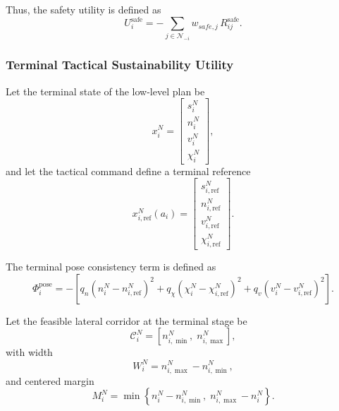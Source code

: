 \documentclass[final ,3p, times]{elsarticle}
\begin{document}
Thus, the safety utility is defined as
\begin{equation}
U_i^{\mathrm{safe}}
=
-
\sum_{j\in\mathcal{N}_{-i}}
w_{safe,j}\,
R_{ij}^{\mathrm{safe}}.
\label{eq:safety_utility}
\end{equation}

\subsubsection{Terminal Tactical Sustainability Utility}

Let the terminal state of the low-level plan be
\begin{equation}
x_i^{N}=
\begin{bmatrix}
s_i^{N}\\
n_i^{N}\\
v_i^{N}\\
\chi_i^{N}
\end{bmatrix},
\label{eq:terminal_state}
\end{equation}
and let the tactical command define a terminal reference
\begin{equation}
x_{i,\mathrm{ref}}^{N}(a_i)
=
\begin{bmatrix}
s_{i,\mathrm{ref}}^{N}\\
n_{i,\mathrm{ref}}^{N}\\
v_{i,\mathrm{ref}}^{N}\\
\chi_{i,\mathrm{ref}}^{N}
\end{bmatrix}.
\label{eq:terminal_reference}
\end{equation}

The terminal pose consistency term is defined as
\begin{equation}
\Phi_i^{\mathrm{pose}}
=
-
\left[
q_n (n_i^N-n_{i,\mathrm{ref}}^N)^2
+
q_\chi (\chi_i^N-\chi_{i,\mathrm{ref}}^N)^2
+
q_v (v_i^N-v_{i,\mathrm{ref}}^N)^2
\right].
\label{eq:terminal_pose_term}
\end{equation}

Let the feasible lateral corridor at the terminal stage be
\begin{equation}
\mathcal{C}_i^N = [n_{i,\min}^N,\;n_{i,\max}^N],
\label{eq:terminal_corridor}
\end{equation}
with width
\begin{equation}
W_i^N = n_{i,\max}^N - n_{i,\min}^N,
\label{eq:terminal_corridor_width}
\end{equation}
and centered margin
\begin{equation}
M_i^N
=
\min\left\{
n_i^N-n_{i,\min}^N,\;
n_{i,\max}^N-n_i^N
\right\}.
\label{eq:terminal_corridor_margin}
\end{equation}
\end{document}
